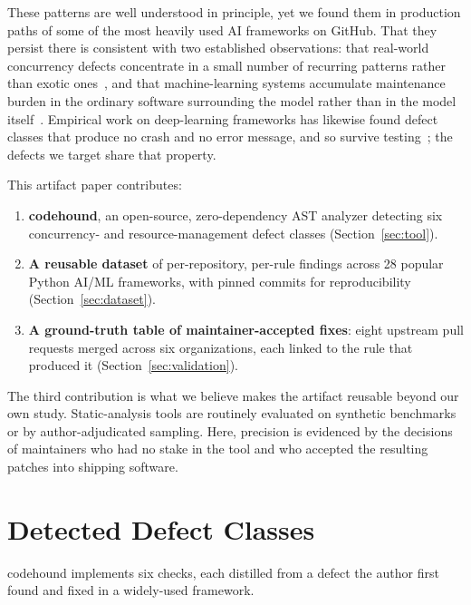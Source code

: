 \documentclass[conference]{IEEEtran}
\begin{document}
These patterns are well understood in principle, yet we found them in production paths of some of the most heavily used AI frameworks on GitHub. That they persist there is consistent with two established observations: that real-world concurrency defects concentrate in a small number of recurring patterns rather than exotic ones~\cite{lu2008}, and that machine-learning systems accumulate maintenance burden in the ordinary software surrounding the model rather than in the model itself~\cite{sculley2015}. Empirical work on deep-learning frameworks has likewise found defect classes that produce no crash and no error message, and so survive testing~\cite{silentbugs,dlbugs}; the defects we target share that property.

This artifact paper contributes:

\begin{enumerate}
  \item \textbf{codehound}, an open-source, zero-dependency AST analyzer detecting six concurrency- and resource-management defect classes (Section~\ref{sec:tool}).
  \item \textbf{A reusable dataset} of per-repository, per-rule findings across 28 popular Python AI/ML frameworks, with pinned commits for reproducibility (Section~\ref{sec:dataset}).
  \item \textbf{A ground-truth table of maintainer-accepted fixes}: eight upstream pull requests merged across six organizations, each linked to the rule that produced it (Section~\ref{sec:validation}).
\end{enumerate}

The third contribution is what we believe makes the artifact reusable beyond our own study. Static-analysis tools are routinely evaluated on synthetic benchmarks or by author-adjudicated sampling. Here, precision is evidenced by the decisions of maintainers who had no stake in the tool and who accepted the resulting patches into shipping software.

\section{Detected Defect Classes}
codehound implements six checks, each distilled from a defect the author first found and fixed in a widely-used framework.
\end{document}
